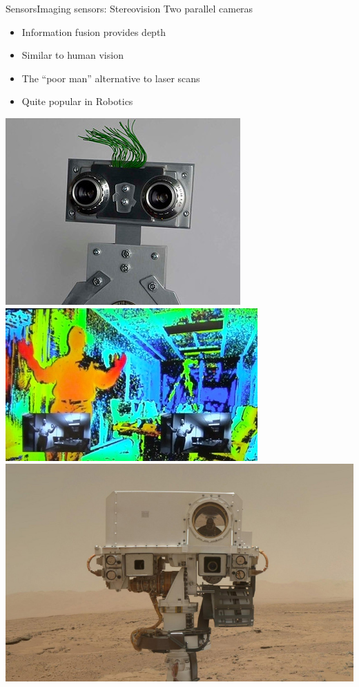 \documentclass[10pt,compress]{beamer} %
\begin{document}
\begin{frame}{Sensors}{Imaging sensors: Stereovision}
	Two parallel cameras
	\begin{itemize}
		\item Information fusion provides depth
		\item Similar to human vision
		\item The ``poor man'' alternative to laser scans
		\item Quite popular in Robotics
	\end{itemize}

	\begin{center}
	\includegraphics[width=0.3\linewidth]{figs/stereo.jpg}\enspace
	\includegraphics[width=0.3\linewidth]{figs/stereovision.jpg}\enspace
	\includegraphics[width=0.3\linewidth]{figs/curiositystereo.jpg}
	\end{center}
\end{frame}
\end{document}
